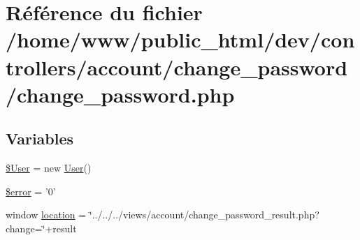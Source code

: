 \hypertarget{controllers_2account_2change__password_2change__password_8php}{\section{Référence du fichier /home/www/public\-\_\-html/dev/controllers/account/change\-\_\-password/change\-\_\-password.php}
\label{controllers_2account_2change__password_2change__password_8php}
}
\subsection*{Variables}
\begin{DoxyCompactItemize}
\item 
\hyperlink{controllers_2account_2change__password_2change__password_8php_a77cc6ebf3902e67557ab5de9317a11c2}{\$\-User} = new \hyperlink{class_user}{User}()
\item 
\hyperlink{controllers_2account_2change__password_2change__password_8php_aeba2ab722cedda53dbb7ec1a59f45550}{\$error} = '0'
\item 
window \hyperlink{controllers_2account_2change__password_2change__password_8php_ade3950acfbce45eb72f40d461349f6fc}{location} = \char`\"{}../../../views/account/change\-\_\-password\-\_\-result.\-php?change=\char`\"{}+result
\end{DoxyCompactItemize}


